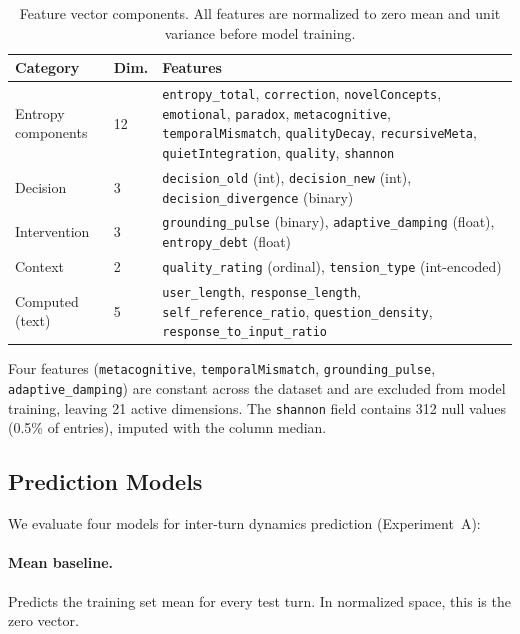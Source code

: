 \documentclass[twoside,11pt]{article}
\begin{document}
\begin{table}[t]
\caption{Feature vector components. All features are normalized to zero mean
and unit variance before model training.}
\label{tab:features}
\centering
\small
\begin{tabular}{@{}llp{7cm}@{}}
\toprule
Category & Dim. & Features \\
\midrule
Entropy components & 12 & \texttt{entropy\_total}, \texttt{correction},
  \texttt{novelConcepts}, \texttt{emotional}, \texttt{paradox},
  \texttt{metacognitive}, \texttt{temporalMismatch}, \texttt{qualityDecay},
  \texttt{recursiveMeta}, \texttt{quietIntegration}, \texttt{quality},
  \texttt{shannon} \\
Decision & 3 & \texttt{decision\_old} (int), \texttt{decision\_new} (int),
  \texttt{decision\_divergence} (binary) \\
Intervention & 3 & \texttt{grounding\_pulse} (binary),
  \texttt{adaptive\_damping} (float), \texttt{entropy\_debt} (float) \\
Context & 2 & \texttt{quality\_rating} (ordinal),
  \texttt{tension\_type} (int-encoded) \\
Computed (text) & 5 & \texttt{user\_length}, \texttt{response\_length},
  \texttt{self\_reference\_ratio}, \texttt{question\_density},
  \texttt{response\_to\_input\_ratio} \\
\bottomrule
\end{tabular}
\end{table}

Four features (\texttt{metacognitive}, \texttt{temporalMismatch},
\texttt{grounding\_pulse}, \texttt{adaptive\_damping}) are constant across the
dataset and are excluded from model training, leaving 21 active dimensions.
The \texttt{shannon} field contains 312 null values (0.5\% of entries),
imputed with the column median.

\subsection{Prediction Models}
\label{sec:method-models}

We evaluate four models for inter-turn dynamics prediction
(Experiment~A):

\paragraph{Mean baseline.} Predicts the training set mean for every test turn.
In normalized space, this is the zero vector.
\end{document}
